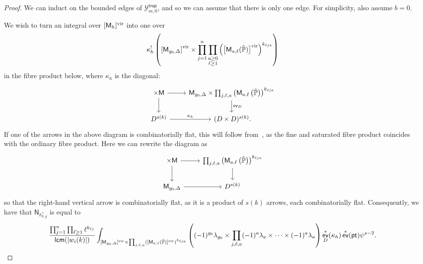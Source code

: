 \documentclass[11pt]{amsart}
\numberwithin{equation}{section}
\theoremstyle{plain}
\theoremstyle{remark}
\theoremstyle{definition}
\DeclareMathOperator{\ev}{\mathsf{ev}}
\newcommand{\cY}{\mathcal{Y}}
\newcommand{\PP}{\mathbb{P}}
\newcommand{\vir}{\text{\rm vir}}
\newcommand{\pt}{{\mathsf{pt}}}
\begin{document}
\begin{proof}
We can induct on the bounded edges of $\cY^{\mathsf{trop}}_{m,0}$, and so we can assume that there is only one edge. For simplicity, also assume $b=0$. 

We wish to turn an integral over $[\mathsf{M}_{h}]^{\vir}$ into one over
$$\kappa_{h}^!\left(\left[\mathsf{M}_{g_0,\Delta}\right]^{\vir} \times \prod_{j=1}^{n}\prod\limits_{\substack{a \geq 0 \\ \ell\geq 1}}  \left(\left[\mathsf{M}_{a,\ell}(\tilde{\PP})\right]^{\vir}\right)^{k_{\ell j a}}\right)$$ in the fibre product below, where $\kappa_h$ is the diagonal: 
\begin{equation*}
    \begin{tikzcd}
      \times \mathsf{M} \arrow[d] \arrow[r] & {\mathsf{M}_{g_0,\Delta} \times \prod_{j,\ell, a}  \left(\mathsf{M}_{a,\ell}\left(\tilde{\PP}\right)\right)^{k_{\ell j a}}} \arrow[d,"\ev_D"] \\
D^{s(k)} \arrow[r, "\kappa_h"]            & (D \times D)^{s(k)}\rlap{.}                                                                
\end{tikzcd}
\end{equation*}
If one of the arrows in the above diagram is combinatorially flat, this will follow from~\cite[Section 12.3]{maulik2025logarithmicenumerativegeometrycurves}, as the fine and saturated fibre product coincides with the ordinary fibre product. Here we can rewrite the diagram as 
\begin{equation*}
    \begin{tikzcd}
\times \mathsf{M} \arrow[d] \arrow[r] & {\prod_{j,\ell,a}  \left(\mathsf{M}_{a,\ell}\left(\tilde{\PP}\right)\right)^{k_{\ell j a}}} \arrow[d] \\
\mathsf{M}_{g_0,\Delta} \arrow[r]            & D^{s(k)}             
\end{tikzcd}
\end{equation*}
so that the right-hand vertical arrow is combinatorially flat, as it is a product of $s(k)$ arrows, each com\-bi\-na\-to\-ri\-ally flat. Consequently, we have that $\mathsf{N}_{h_{k,\underline{g}}^s}$ is equal to
$$\frac{\prod_{j=1}^{n}\prod_{\ell \geq 1}\ell^{k_{\ell j}}}{\mathsf{lcm}(|w_i(k)|)}\int_{[\mathsf{M}_{g_0,\Delta}]^{\vir} \times \prod_{j,\ell, a}  ([\mathsf{M}_{a,\ell}(\tilde{\PP})]^{\vir})^{k_{\ell j a}}} \left((-1)^{g_0} \lambda_{g_0} \times \prod_{j,\ell,a} (-1)^{a} \lambda_{a} \times \dots \times (-1)^{a} \lambda_{a} \right)\ev_D^*(\kappa_h) \ev^*(\pt)\psi^{s-2}.$$

\end{proof}
\end{document}
